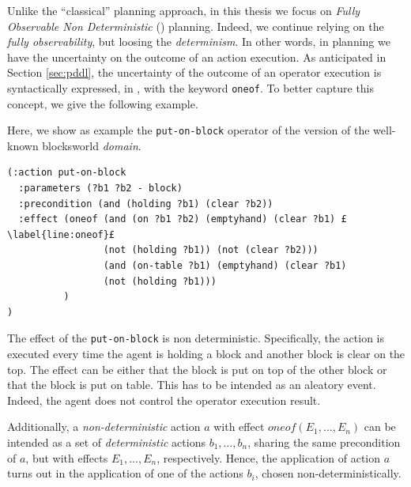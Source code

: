 Unlike the ``classical'' planning approach, in this thesis we focus on \textit{Fully Observable Non Deterministic} (\FOND) planning. Indeed, we continue relying on the \textit{fully observability}, but loosing the \textit{determinism}. In other words, in \FOND planning we have the uncertainty on the outcome of an action execution. As anticipated in Section \ref{sec:pddl}, the uncertainty of the outcome of an operator execution is syntactically expressed, in \PDDL, with the keyword \texttt{oneof}. To better capture this concept, we give the following example.

\begin{example}
Here, we show as example the \texttt{put-on-block} operator of the \FOND version of the well-known blocksworld \PDDL \textit{domain}.
\begin{lstlisting}[language=PDDL, escapechar=£]
(:action put-on-block
  :parameters (?b1 ?b2 - block)
  :precondition (and (holding ?b1) (clear ?b2))
  :effect (oneof (and (on ?b1 ?b2) (emptyhand) (clear ?b1) £\label{line:oneof}£
                 (not (holding ?b1)) (not (clear ?b2)))
                 (and (on-table ?b1) (emptyhand) (clear ?b1) 
                 (not (holding ?b1)))
          )
)
\end{lstlisting}
The effect of the \texttt{put-on-block} is non deterministic. Specifically, the action is executed every time the agent is holding a block and another block is clear on the top. The effect can be either that the block is put on top of the other block or that the block is put on table. This has to be intended as an aleatory event. Indeed, the agent does not control the operator execution result.
\end{example}

Additionally, a \textit{non-deterministic} action $a$ with effect $oneof(E_1,\dots,E_n)$ can be intended as a set of \textit{deterministic} actions $b_1,\dots,b_n$, sharing the same precondition of $a$, but with effects $E_1,\dots,E_n$, respectively. Hence, the application of action $a$ turns out in the application of one of the actions $b_i$, chosen non-deterministically.

